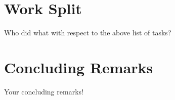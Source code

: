 \documentclass[
10pt, %
a4paper, %
oneside, %
headinclude,footinclude, %
BCOR5mm, %
]{scrartcl}
\begin{document}
\section{Work Split}
Who did what with respect to the above list of tasks?

\section{Concluding Remarks}
Your concluding remarks!


\renewcommand{\refname}{\spacedlowsmallcaps{References}} %




\end{document}
